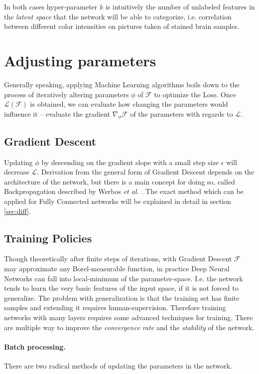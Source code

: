 In both cases hyper-parameter $k$ is intuitively the number of unlabeled features in the \emph{latent space} that the network will be able to categorize, i.e. correlation between different color intensities on pictures taken of stained brain samples.


\section{Adjusting parameters}
Generally speaking, applying Machine Learning algorithms boils down to the process of iteratively altering parameters $\phi$ of $\mathcal{F}$ to optimize the Loss.
Once $\mathcal{L}(\mathcal{F})$ is obtained, we can evaluate how changing the parameters would influence it -- evaluate the gradient $\nabla_\phi \mathcal{F}$ of the parameters  with regards to $\mathcal{L}$.

\subsection{Gradient Descent}
Updating $\phi$ by descending on the gradient slope with a small step size $\epsilon$ will decrease $\mathcal{L}$.
Derivation from the general form of Gradient Descent depends on the architecture of the network, 
but there is a main concept for doing so, called Backpropagation described by Werbos \emph{et al.} \cite{werbos1994roots}. 
The exact method which can be applied for Fully Connected networks 
will be explained in detail in section \ref{sec:diff}.

\subsection{Training Policies}
Though theoretically after finite steps of iterations, with Gradient Descent $\mathcal{F}$ may approximate any Borel-measurable function, 
in practice Deep Neural Networks can fall into local-minimum of the parameter-space.
I.e. the network tends to learn the very basic features of the input space, if it is not forced to generalize.
The problem with generalization is that the training set has finite samples and extending it requires human-supervision.
Therefore training networks with many layers requires some advanced techniques for training.
There are multiple way to improve the \emph{convergence rate} and the \emph{stability} of the network.

\paragraph{Batch processing.} There are two radical methods of updating the parameters in the network. 

